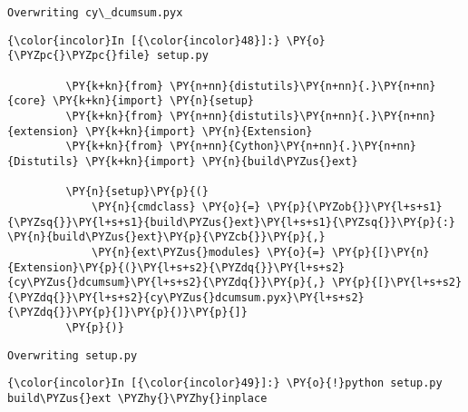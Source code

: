     \begin{Verbatim}[commandchars=\\\{\}]
Overwriting cy\_dcumsum.pyx

    \end{Verbatim}



    \begin{Verbatim}[commandchars=\\\{\}]
{\color{incolor}In [{\color{incolor}48}]:} \PY{o}{\PYZpc{}\PYZpc{}file} setup.py
         
         \PY{k+kn}{from} \PY{n+nn}{distutils}\PY{n+nn}{.}\PY{n+nn}{core} \PY{k+kn}{import} \PY{n}{setup}
         \PY{k+kn}{from} \PY{n+nn}{distutils}\PY{n+nn}{.}\PY{n+nn}{extension} \PY{k+kn}{import} \PY{n}{Extension}
         \PY{k+kn}{from} \PY{n+nn}{Cython}\PY{n+nn}{.}\PY{n+nn}{Distutils} \PY{k+kn}{import} \PY{n}{build\PYZus{}ext}
         
         \PY{n}{setup}\PY{p}{(}
             \PY{n}{cmdclass} \PY{o}{=} \PY{p}{\PYZob{}}\PY{l+s+s1}{\PYZsq{}}\PY{l+s+s1}{build\PYZus{}ext}\PY{l+s+s1}{\PYZsq{}}\PY{p}{:} \PY{n}{build\PYZus{}ext}\PY{p}{\PYZcb{}}\PY{p}{,}
             \PY{n}{ext\PYZus{}modules} \PY{o}{=} \PY{p}{[}\PY{n}{Extension}\PY{p}{(}\PY{l+s+s2}{\PYZdq{}}\PY{l+s+s2}{cy\PYZus{}dcumsum}\PY{l+s+s2}{\PYZdq{}}\PY{p}{,} \PY{p}{[}\PY{l+s+s2}{\PYZdq{}}\PY{l+s+s2}{cy\PYZus{}dcumsum.pyx}\PY{l+s+s2}{\PYZdq{}}\PY{p}{]}\PY{p}{)}\PY{p}{]}
         \PY{p}{)}
\end{Verbatim}

    \begin{Verbatim}[commandchars=\\\{\}]
Overwriting setup.py

    \end{Verbatim}

    \begin{Verbatim}[commandchars=\\\{\}]
{\color{incolor}In [{\color{incolor}49}]:} \PY{o}{!}python setup.py build\PYZus{}ext \PYZhy{}\PYZhy{}inplace
\end{Verbatim}

